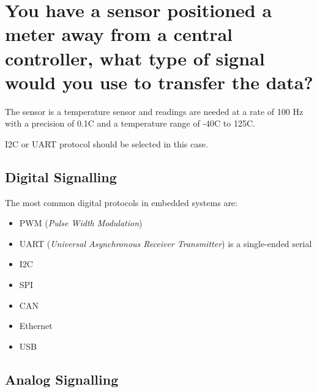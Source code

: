 \documentclass[main.tex]{subfiles}
\begin{document}
\section{You have a sensor positioned a meter away from a central controller, what type of signal would you use to transfer the data?}
The sensor is a temperature sensor and readings are needed at a rate of 100 Hz with a precision of 0.1C and a temperature range of -40C to 125C.

\spoilerline

\noindent I2C or UART protocol should be selected in this case. 

\subsection{Digital Signalling}


The most common digital protocols in embedded systems are:
\begin{itemize} %
    \item PWM (\textit{Pulse Width Modulation})
    \item UART (\textit{Universal Asynchronous Receiver Transmitter}) is a single-ended serial
    \item I2C 
    \item SPI
    \item CAN
    \item Ethernet
    \item USB
\end{itemize}


\subsection{Analog Signalling}
\end{document}
